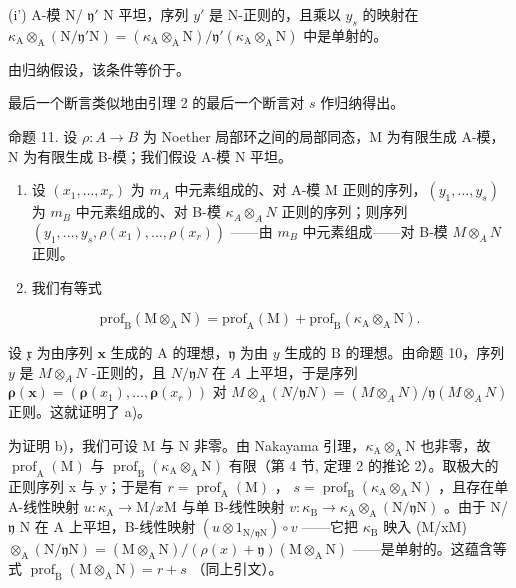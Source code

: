 (i') A-模 N/ \(\mathfrak{y}'\) N 平坦，序列 \(y'\) 是 N-正则的，且乘以 \(y_s\) 的映射在 \(\kappa_{\mathrm{A}} \otimes_{\mathrm{A}} (\mathrm{N}/\mathfrak{y}'\mathrm{N}) = (\kappa_{\mathrm{A}} \otimes_{\mathrm{A}} \mathrm{N})/\mathfrak{y}'(\kappa_{\mathrm{A}} \otimes_{\mathrm{A}} \mathrm{N})\) 中是单射的。

由归纳假设，该条件等价于。

最后一个断言类似地由引理 2 的最后一个断言对 \(s\) 作归纳得出。

命题 11. 设 \(\rho: A \to B\) 为 Noether 局部环之间的局部同态，M 为有限生成 A-模，N 为有限生成 B-模；我们假设 A-模 N 平坦。

\begin{enumerate}
\def\labelenumi{\alph{enumi})}
\item
  设 \((x_{1},\ldots,x_{r})\) 为 \(m_{A}\) 中元素组成的、对 A-模 M 正则的序列，\((y_{1},\ldots,y_{s})\) 为 \(m_{B}\) 中元素组成的、对 B-模 \(\kappa_{A}\otimes_{A}N\) 正则的序列；则序列 \((y_{1},\ldots,y_{s},\rho(x_{1}),\ldots,\rho(x_{r}))\) ——由 \(m_{B}\) 中元素组成——对 B-模 \(M\otimes_{A}N\) 正则。
\item
  我们有等式
\end{enumerate}

\[
\mathrm{prof} _ {\mathrm{B}} (\mathrm{M} \otimes_ {\mathrm{A}} \mathrm{N}) = \mathrm{prof} _ {\mathrm{A}} (\mathrm{M}) + \mathrm{prof} _ {\mathrm{B}} (\kappa_ {\mathrm{A}} \otimes_ {\mathrm{A}} \mathrm{N}).
\]

设 \(\mathfrak{x}\) 为由序列 \(\mathbf{x}\) 生成的 A 的理想，\(\mathfrak{y}\) 为由 \(y\) 生成的 B 的理想。由命题 10，序列 \(y\) 是 \(M \otimes_A N\) -正则的，且 \(N/\mathfrak{y}N\) 在 \(A\) 上平坦，于是序列 \(\boldsymbol{\rho}(\mathbf{x}) = (\boldsymbol{\rho}(x_1), \ldots, \boldsymbol{\rho}(x_r))\) 对 \(M \otimes_A (N/\mathfrak{y}N) = (M \otimes_A N)/\mathfrak{y}(M \otimes_A N)\) 正则。这就证明了 a)。

为证明 b)，我们可设 M 与 N 非零。由 Nakayama 引理，\(\kappa_{\mathrm{A}} \otimes_{\mathrm{A}} \mathrm{N}\) 也非零，故 \(\operatorname{prof}_{\mathrm{A}}(\mathrm{M})\) 与 \(\operatorname{prof}_{\mathrm{B}}(\kappa_{\mathrm{A}} \otimes_{\mathrm{A}} \mathrm{N})\) 有限（第 4 节, 定理 2 的推论 2）。取极大的正则序列 x 与 y；于是有 \(r = \operatorname{prof}_{\mathrm{A}}(\mathrm{M})\) ， \(s = \operatorname{prof}_{\mathrm{B}}(\kappa_{\mathrm{A}} \otimes_{\mathrm{A}} \mathrm{N})\) ，且存在单 A-线性映射 \(u: \kappa_{\mathrm{A}} \to \mathrm{M} / x \mathrm{M}\) 与单 B-线性映射 \(v: \kappa_{\mathrm{B}} \to \kappa_{\mathrm{A}} \otimes_{\mathrm{A}} (\mathrm{N} / \mathfrak{y} \mathrm{N})\) 。由于 N/ \(\mathfrak{y}\) N 在 A 上平坦，B-线性映射 \((u \otimes 1_{\mathrm{N} / \mathfrak{y} \mathrm{N}}) \circ v\) ——它把 \(\kappa_{\mathrm{B}}\) 映入 (M/xM) \(\otimes_{\mathrm{A}} (\mathrm{N} / \mathfrak{y} \mathrm{N}) = (\mathrm{M} \otimes_{\mathrm{A}} \mathrm{N}) / (\rho(x) + \mathfrak{y})(\mathrm{M} \otimes_{\mathrm{A}} \mathrm{N})\) ——是单射的。这蕴含等式 \(\operatorname{prof}_{\mathrm{B}}(\mathrm{M} \otimes_{\mathrm{A}} \mathrm{N}) = r + s\) （同上引文）。

